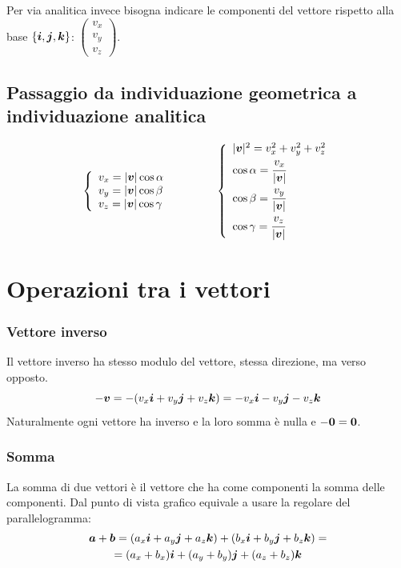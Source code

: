 Per via analitica invece bisogna indicare le componenti del vettore rispetto alla base $\{\boldsymbol{i}, \boldsymbol{j}, \boldsymbol{k}\}$: $\left(
  \begin{array}{l}
      v_x \\v_y\\v_z
    \end{array}\right)
$.
\subsection{Passaggio da individuazione geometrica a individuazione analitica}
\[
  \left\{
  \begin{array}{l}
    v_x=|\boldsymbol{v}|\cos\alpha \\
    v_y=|\boldsymbol{v}|\cos\beta  \\
    v_z=|\boldsymbol{v}|\cos\gamma
  \end{array}
  \right. \qquad \qquad \left\{
  \begin{array}{l}
    |\boldsymbol{v}|^2=v_x^2+v_y^2+v_z^2     \\
    \cos\alpha=\cfrac{v_x}{|\boldsymbol{v}|} \\
    \cos\beta=\cfrac{v_y}{|\boldsymbol{v}|}  \\
    \cos\gamma=\cfrac{v_z}{|\boldsymbol{v}|}
  \end{array}
  \right.
\]


\section{Operazioni tra i vettori}

\subsubsection{Vettore inverso}
Il vettore inverso ha stesso modulo del vettore, stessa direzione,
ma verso opposto.
\[
  -\boldsymbol{v}=-(v_x\boldsymbol{i}+v_y\boldsymbol{j}+v_z \boldsymbol{k})=-v_x\boldsymbol{i}-v_y\boldsymbol{j}-v_z\boldsymbol{k}
\]
Naturalmente ogni vettore ha inverso e la loro somma è nulla e $-\boldsymbol{0}=\boldsymbol{0}$.

\subsubsection{Somma}
La somma di due vettori è il vettore che ha come componenti la somma delle componenti. Dal punto di vista grafico equivale a usare la regolare del parallelogramma:
\begin{multline*}
  \boldsymbol{a}+\boldsymbol{b}=(a_x\boldsymbol{i}+a_y\boldsymbol{j}+a_z \boldsymbol{k})+(b_x\boldsymbol{i}+b_y\boldsymbol{j}+b_z\boldsymbol{k})=\\
  =(a_x+b_x)\boldsymbol{i}+(a_y+b_y)\boldsymbol{j}+(a_z+b_z)\boldsymbol{k}
\end{multline*}

